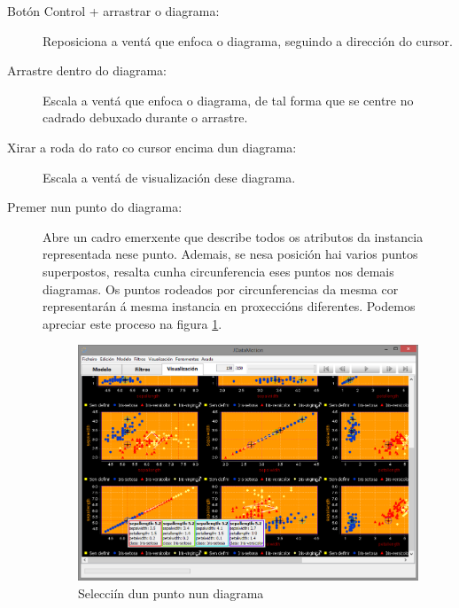 \begin{description}
\item[Botón Control + arrastrar o diagrama:] \hfill
Reposiciona a ventá que enfoca o diagrama, seguindo a dirección do cursor.
\item[Arrastre dentro do diagrama:] \hfill
Escala a ventá que enfoca o diagrama, de tal forma que se centre no cadrado debuxado durante o arrastre.
\item[Xirar a roda do rato co cursor encima dun diagrama:] \hfill
Escala a ventá de visualización dese diagrama.
\item[Premer nun punto do diagrama:] \hfill
Abre un cadro emerxente que describe todos os atributos da instancia representada nese punto. Ademais, se nesa posición hai varios puntos superpostos, resalta cunha circunferencia eses puntos nos demais diagramas. Os puntos rodeados por circunferencias da mesma cor representarán á mesma instancia en proxeccións diferentes. Podemos apreciar este proceso na figura \ref{resaltarPuntoSeleccionado}.
\begin{figure}
\centering
\includegraphics[width=\textwidth,height=\textheight,keepaspectratio]{figuras/resaltarPuntoSeleccionado}
\caption{Selecciín dun punto nun diagrama}
\label{resaltarPuntoSeleccionado}
\end{figure}


\end{description}

